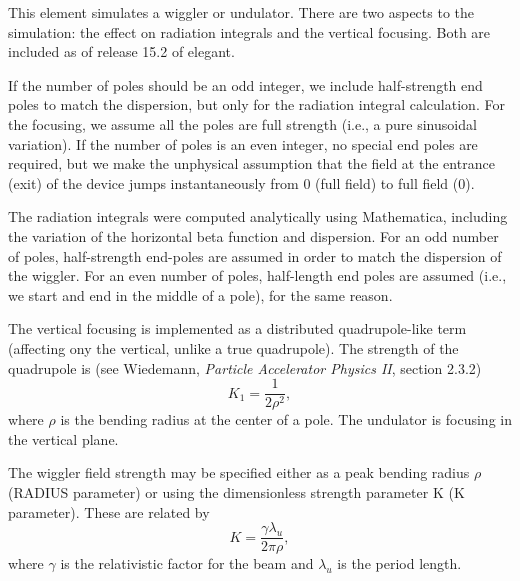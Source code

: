 This element simulates a wiggler or undulator.  There are two aspects
to the simulation: the effect on radiation integrals and the vertical
focusing.  Both are included as of release 15.2 of elegant.  

If the number of poles should be an odd integer, we include
half-strength end poles to match the dispersion, but only for the
radiation integral calculation.  For the focusing, we assume all the
poles are full strength (i.e., a pure sinusoidal variation).  If the
number of poles is an even integer, no special end poles are required,
but we make the unphysical assumption that the field at the entrance
(exit) of the device jumps instantaneously from 0 (full field) to full
field (0).

The radiation integrals were computed analytically using Mathematica,
including the variation of the horizontal beta function and dispersion. 
For an odd number of poles, half-strength end-poles are assumed in order
to match the dispersion of the wiggler.  For an even number of poles,
half-length end poles are assumed (i.e., we start and end in 
the middle of a pole), for the same reason.

The vertical focusing is implemented as a distributed quadrupole-like
term (affecting ony the vertical, unlike a true quadrupole).  The
strength of the quadrupole is (see Wiedemann, {\em Particle Accelerator
Physics II}, section 2.3.2)
\begin{equation}
K_1 = \frac{1}{2\rho^2},
\end{equation}
where $\rho$ is the bending radius at the center of a pole.  The
undulator is focusing in the vertical plane.

The wiggler field strength may be specified either as a peak bending 
radius $\rho$ (RADIUS parameter) or using the dimensionless strength parameter
K (K parameter).  These are related by
\begin{equation}
K = \frac{\gamma \lambda_u}{2 \pi \rho},
\end{equation}
where $\gamma$ is the relativistic factor for the beam and $\lambda_u$ is
the period length.

